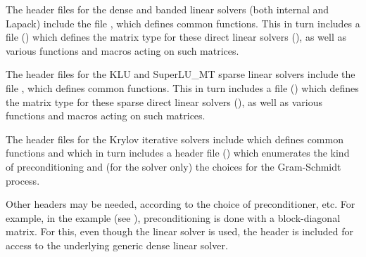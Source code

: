The header files for the dense and banded linear solvers (both
internal and Lapack) include the file , which
defines common functions.  This in turn includes a file
() which defines the matrix type for these
direct linear solvers (), as well as various functions and
macros acting on such matrices.

The header files for the KLU and SuperLU\_MT sparse linear solvers
include the file , which defines common functions.
This in turn includes a file () which defines
the matrix type for these sparse direct linear solvers (),
as well as various functions and macros acting on such matrices.

The header files for the Krylov iterative solvers include 
which defines common functions and which in turn includes a header file ()
which enumerates the kind of preconditioning and (for the {\spgmr} solver only) the choices for the Gram-Schmidt process.

Other headers may be needed, according to the choice of
preconditioner, etc.  For example, in the 
example (see \cite{ida_ex}), preconditioning is done with a
block-diagonal matrix. For this, even though the {\idaspgmr} linear
solver is used, the header  is included for
access to the underlying generic dense linear solver.

